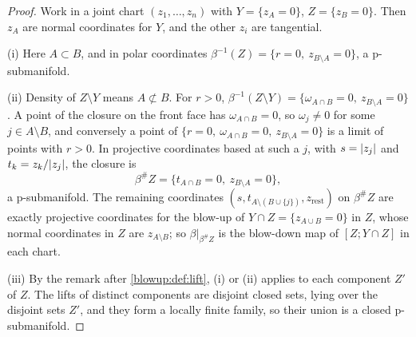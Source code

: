 \begin{proof}
Work in a joint chart $(z_1,\dots,z_n)$ with $Y=\{z_A=0\}$, $Z=\{z_B=0\}$. Then $z_A$ are
normal coordinates for $Y$, and the other $z_i$ are tangential.

(i) Here $A\subset B$, and in polar coordinates $\beta^{-1}(Z)=\{r=0,\ z_{B\setminus A}=0\}$,
a p-submanifold.

(ii) Density of $Z\setminus Y$ means $A\not\subset B$. For $r>0$,
$\beta^{-1}(Z\setminus Y)=\{\omega_{A\cap B}=0,\ z_{B\setminus A}=0\}$. A point of the closure
on the front face has $\omega_{A\cap B}=0$, so $\omega_j\ne0$ for some $j\in A\setminus B$,
and conversely a point of $\{r=0,\ \omega_{A\cap B}=0,\ z_{B\setminus A}=0\}$ is a limit of points
with $r>0$. In projective coordinates based at such a $j$, with $s=\lvert z_j\rvert$ and
$t_k=z_k/\lvert z_j\rvert$, the closure is
\begin{equation*}
  \beta^\#Z=\{t_{A\cap B}=0,\ z_{B\setminus A}=0\},
\end{equation*}
a p-submanifold. The remaining coordinates $(s,t_{A\setminus(B\cup\{j\})},z_{\text{rest}})$ on
$\beta^\#Z$ are exactly projective coordinates for the blow-up of $Y\cap Z=\{z_{A\cup B}=0\}$
in $Z$, whose normal coordinates in $Z$ are $z_{A\setminus B}$; so $\beta|_{\beta^\#Z}$ is the
blow-down map of $[Z;Y\cap Z]$ in each chart.

(iii) By the remark after \cref{blowup:def:lift}, (i) or (ii) applies to each component
$Z'$ of $Z$. The lifts of distinct components are disjoint closed sets, lying over the
disjoint sets $Z'$, and they form a locally finite family, so their union is a closed
p-submanifold.
\end{proof}

